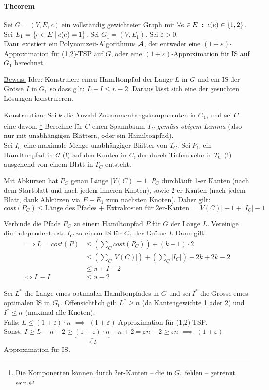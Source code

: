 \paragraph{Theorem}
Sei $G =(V,E,c)$ ein vollständig gewichteter Graph mit $\forall e \in E \; : \; c(e) \in \{1,2\}$.
Sei $E_1 = \{e \in E \; | \; c(e) = 1 \}$. Sei $G_1=(V,E_1)$.
Sei $\varepsilon > 0$.
\\
Dann existiert ein Polynomzeit-Algorithmus $\mathcal{A}$, der entweder eine $(1+\varepsilon)$-Approximation für (1,2)-TSP auf $G$,
oder eine $(1+\varepsilon)$-Approximation für IS auf $G_1$ berechnet.

\underline{Beweis:}
Idee: Konstruiere einen Hamiltonpfad der Länge $L$ in $G$ und ein IS der Grösse $I$ in $G_1$ so dass gilt: $L-I \leq n-2$.
Daraus lässt sich eine der gesuchten Lösungen konstruieren.

Konstruktion: Sei $k$ die Anzahl Zusammenhangskomponenten in $G_1$, und sei $C$ eine davon.%
\footnote{Die Komponenten können durch 2er-Kanten -- die in $G_1$ fehlen -- getrennt sein.}
Berechne für $C$ einen Spannbaum $T_C$ \emph{gemäss obigem Lemma} (also nur mit unabhängigen Blättern, oder ein Hamiltonpfad).
\\
Sei $I_C$ eine maximale Menge unabhängiger Blätter von $T_C$.
Sei $P_C$ ein Hamiltonpfad in $G$ (!) auf den Knoten in $C$, der durch Tiefensuche in $T_C$ (!) ausgehend
von einem Blatt in $T_C$ entsteht.

Mit Abkürzen hat $P_C$ genau Länge $|V(C)|-1$.
$P_C$ durchläuft 1-er Kanten (nach dem Startblatt und nach jedem inneren Knoten), sowie 2-er Kanten
(nach jedem Blatt, dank Abkürzen via $E-E_1$ zum nächsten Knoten).
Daher gilt:
$$ cost(P_C) \leq \text{Länge des Pfades + Extrakosten für 2er-Kanten} = |V(C)|-1 + |I_C|-1 $$

Verbinde die Pfade $P_C$ zu einem Hamiltonpfad $P$ für $G$ der Länge $L$.
Vereinige die independent sets $I_C$ zu einem IS für $G_1$ der Grösse $I$.
Dann gilt:
\begin{align*}
\implies L = cost(P)
& \leq \left( \sum_C cost(P_C) \right) + (k-1) \cdot 2 \\
& \leq \left( \sum_C |V(C)| \right) + \left( \sum_C |I_C| \right) - 2k + 2k - 2 \\
& \leq n + I - 2 \\
\iff L - I & \leq n-2
\end{align*}

Sei $L^*$ die Länge eines optimalen Hamiltonpfades in $G$ und sei $I^*$ die Grösse eines optimalen IS in $G_1$.
Offensichtlich gilt $L^* \geq n$ (da Kantengewichte 1 oder 2) und $I^* \leq n$ (maximal alle Knoten).
\\
Falls: $L \leq (1+\varepsilon) \cdot n$
$\implies$ $(1+\varepsilon)$-Approximation für (1,2)-TSP.
\\
Sonst: $I \geq L - n+2 \geq \underbrace{(1+\varepsilon) \cdot n}_{\leq L} - n+2 = \varepsilon n + 2 \geq \varepsilon n$
$\implies$ $(1+\varepsilon)$-Approximation für IS.

